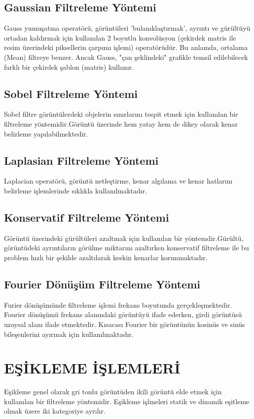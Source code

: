 \subsection{Gaussian Filtreleme Yöntemi}
Gauss yumuşatma operatörü, görüntüleri 'bulanıklaştırmak', ayrıntı ve gürültüyü ortadan kaldırmak için kullanılan 2 boyutlu konvolüsyon (çekirdek matris ile resim üzerindeki piksellerin çarpımı işlemi) operatörüdür. Bu anlamda, ortalama (Mean) filtreye benzer. Ancak Gauss, "çan şeklindeki" grafikle temsil edilebilecek farklı bir çekirdek şablon (matris) kullanır. 
\subsection{Sobel Filtreleme Yöntemi}
Sobel filtre görüntülerdeki objelerin sınırlarını tespit etmek için kullanılan bir filtreleme yöntemidir.Görüntü üzerinde hem yatay hem de dikey olarak kenar belirleme yapılabilmektedir.
\subsection{Laplasian Filtreleme Yöntemi}
Laplacian operatörü, görüntü netleştirme, kenar algılama ve kenar hatlarını belirleme işlemlerinde sıklıkla kullanılmaktadır.
\subsection{Konservatif Filtreleme Yöntemi}
Görüntü üzerindeki gürültüleri azaltmak için kullanılan bir yöntemdir.Gürültü, görüntüdeki ayrıntıların görülme miktarını azaltırken konservatif filtreleme ile bu problem hızlı bir şekilde azaltılarak keskin kenarlar korunmaktadır.
\subsection{Fourier Dönüşüm Filtreleme Yöntemi}
Furier dönüşümünde filtreleme işlemi frekans boyutunda gerçekleşmektedir. Fourier dönüşümü frekans alanındaki görüntüyü ifade ederken, girdi görüntüsü uzaysal alanı ifade etmektedir. Kısacası Fourier bir görüntünün kosinüs ve sinüs bileşenlerini ayırmak için kullanılmaktadır.

\section{EŞİKLEME İŞLEMLERİ}
\cite{segmentation}
Eşikleme genel olarak gri tonlu görüntüden ikili görüntü elde etmek için kullanılan bir filtreleme yöntemidir. Eşikleme işlmeleri statik ve dinamik eşitleme olmak üzere iki kategoriye ayrılır.
